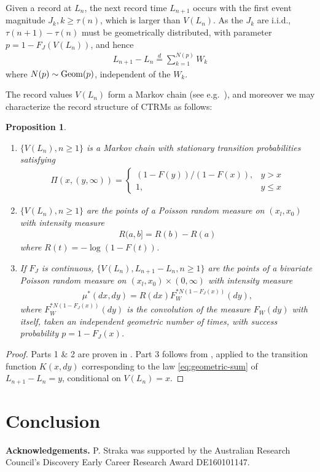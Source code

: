 \documentclass[12pt]{article}
\newtheorem{proposition}[equation]{Proposition}
\newcommand{\1}{\mathbf 1}
\begin{document}
Given a record at $L_n$, the next record time $L_{n+1}$ occurs with the first event magnitude $J_k, k \ge \tau(n)$, which is larger than $V(L_n)$. As the $J_k$ are i.i.d., $\tau(n+1) - \tau(n)$ must be geometrically distributed, with parameter $p = 1 - F_J(V(L_n))$, and hence 
\begin{align} \label{eq:geometric-sum}
L_{n+1} - L_n \stackrel{d}{=} \sum_{k=1}^{N(p)} W_k
\end{align}
where $N(p) \sim {\rm Geom}(p)$, independent of the $W_k$. 

The record values $V(L_n)$ form a Markov chain (see e.g.\ \cite{resnick2013extreme}), and moreover we may characterize the record structure of CTRMs as follows: 

\begin{proposition}
\begin{enumerate}
\item
$\{V(L_n), n \ge 1\}$ is a Markov chain with stationary transition probabilities satisfying
\begin{align*}
\Pi(x, (y,\infty)) = 
\begin{cases}
(1-F(y)) / (1-F(x)), & y > x
\\
1, & y \le x
\end{cases}
\end{align*}
\item
$\{V(L_n), n \ge 1\}$ are the points of a Poisson random measure on $(x_l, x_0)$ with intensity measure
\begin{align*}
R(a,b] = R(b) - R(a)
\end{align*}
where $R(t) = -\log(1-F(t))$. 
\item
If $F_J$ is continuous, $\{V(L_n), L_{n+1} - L_n, n \ge 1\}$ are the points of a bivariate Poisson random measure on
$(x_l, x_0) \times (0,\infty)$ with intensity measure
\begin{align*}
\mu^*(dx, dy) = R(dx) F_W^{*N(1-F_J(x))}(dy),
\end{align*}
where $F_W^{*N(1-F_J(x))}(dy)$ is the convolution of the measure $F_W(dy)$ with itself, taken an independent geometric number of times, with success probability $p = 1-F_J(x)$.
\end{enumerate}
\end{proposition}

\begin{proof}
Parts 1 \& 2 are proven in 
\cite[Proposition 4.1 (i) \& (iii)]{resnick2013extreme}.
Part 3 follows from \cite[Proposition 3.8]{resnick2013extreme}, 
applied to the transition function $K(x,dy)$ corresponding to the law \eqref{eq:geometric-sum} of $L_{n+1} - L_n = y$, conditional on $V(L_n) = x$. 
\end{proof}









\section{Conclusion}


{\bf Acknowledgements.} P. Straka was supported by the Australian Research Council’s Discovery Early Career Research Award DE160101147.




\end{document}
